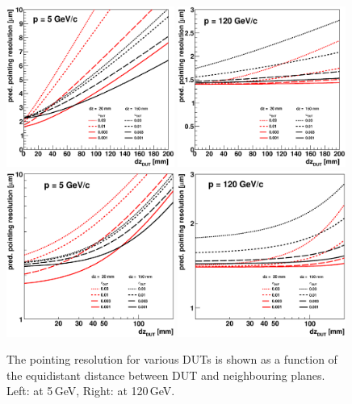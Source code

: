 \begin{figure}[tbp]
  \centering
  \includegraphics[width=0.49\textwidth]{figures/CalcResoVsDzdut_Desy_2}
  \includegraphics[width=0.49\textwidth]{figures/CalcResoVsDzdut_Cern_2}\\
  \includegraphics[width=0.49\textwidth]{figures/CalcResoVsDzdut_Desy_loglog_2}
  \includegraphics[width=0.49\textwidth]{figures/CalcResoVsDzdut_Cern_loglog_2}
  \caption[Pointing resolution for various DUTs as a function of the distance between DUT and neighbouring planes]{
  The pointing resolution for various DUTs is shown as a function of the equidistant distance between DUT and neighbouring planes.
  Left: at 5\,GeV, Right: at 120\,GeV. }
\label{fig:CalcResos_dzdut}
\end{figure}

